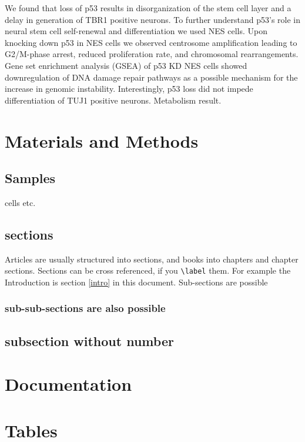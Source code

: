 \documentclass[11pt,a4paper]{article}
\begin{document}
We found that loss of p53 results in disorganization of the stem cell layer and a delay in generation of TBR1 positive neurons. To further understand p53's role in neural stem cell self-renewal and differentiation we used NES cells. Upon knocking down p53 in NES cells we observed centrosome amplification leading to G2/M-phase arrest, reduced proliferation rate, and chromosomal rearrangements. Gene set enrichment analysis (GSEA) of p53 KD NES cells showed downregulation of DNA damage repair pathways as a possible mechanism for the increase in genomic instability. Interestingly, p53 loss did not impede differentiation of TUJ1 positive neurons. Metabolism result. 


\section{Materials and Methods \label{intro}}

\subsection{Samples}

cells etc. 

\subsection{sections}

Articles are usually structured into sections, and books into chapters and chapter sections. Sections can be cross referenced, if you \verb+\label+ them. For example the Introduction is section \ref{intro} in this document. Sub-sections are possible

\subsubsection{sub-sub-sections are also possible}



\subsection*{subsection without number}




\section{Documentation}




\section{Tables}
\end{document}
